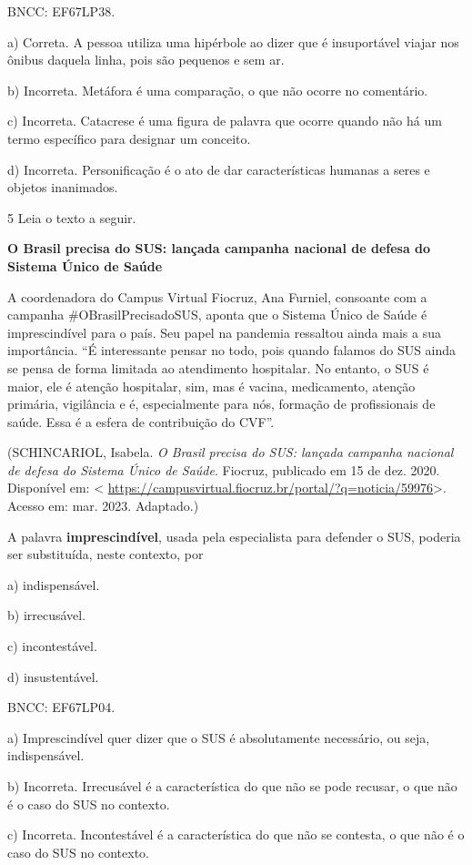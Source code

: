 BNCC: EF67LP38.

a) Correta. A pessoa utiliza uma hipérbole ao dizer que é insuportável
viajar nos ônibus daquela linha, pois são pequenos e sem ar.

b) Incorreta. Metáfora é uma comparação, o que não ocorre no comentário.

c) Incorreta. Catacrese é uma figura de palavra que ocorre quando não há
um termo específico para designar um conceito.

d) Incorreta. Personificação é o ato de dar características humanas a
seres e objetos inanimados.

\num{5} Leia o texto a seguir.

\textbf{O Brasil precisa do SUS: lançada campanha nacional de defesa do
Sistema Único de Saúde}

A coordenadora do Campus Virtual Fiocruz, Ana Furniel, consoante com a
campanha \#OBrasilPrecisadoSUS, aponta que o Sistema Único de Saúde é
imprescindível para o país. Seu papel na pandemia ressaltou ainda mais a
sua importância. ``É interessante pensar no todo, pois quando falamos do
SUS ainda se pensa de forma limitada ao atendimento hospitalar. No
entanto, o SUS é maior, ele é atenção hospitalar, sim, mas é vacina,
medicamento, atenção primária, vigilância e é, especialmente para nós,
formação de profissionais de saúde. Essa é a esfera de contribuição do
CVF''.

(SCHINCARIOL, Isabela. \emph{O Brasil precisa do SUS: lançada campanha
nacional de defesa do Sistema Único de Saúde}. Fiocruz, publicado em 15
de dez. 2020. Disponível em: \textless{}
\url{https://campusvirtual.fiocruz.br/portal/?q=noticia/59976}\textgreater.
Acesso em: mar. 2023. Adaptado.)

A palavra \textbf{imprescindível}, usada pela especialista para defender
o SUS, poderia ser substituída, neste contexto, por

a) indispensável.

b) irrecusável.

c) incontestável.

d) insustentável.

BNCC: EF67LP04.

a) Imprescindível quer dizer que o SUS é absolutamente necessário, ou
seja, indispensável.

b) Incorreta. Irrecusável é a característica do que não se pode recusar,
o que não é o caso do SUS no contexto.

c) Incorreta. Incontestável é a característica do que não se contesta, o
que não é o caso do SUS no contexto.


